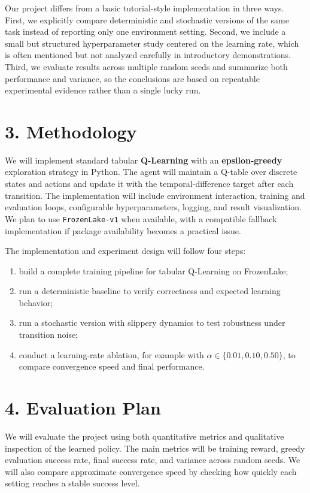 \documentclass[11pt]{article}
\begin{document}
Our project differs from a basic tutorial-style implementation in three ways. First, we explicitly compare deterministic and stochastic versions of the same task instead of reporting only one environment setting. Second, we include a small but structured hyperparameter study centered on the learning rate, which is often mentioned but not analyzed carefully in introductory demonstrations. Third, we evaluate results across multiple random seeds and summarize both performance and variance, so the conclusions are based on repeatable experimental evidence rather than a single lucky run.

\section*{3. Methodology}
We will implement standard tabular \textbf{Q-Learning} with an \textbf{epsilon-greedy} exploration strategy in Python. The agent will maintain a Q-table over discrete states and actions and update it with the temporal-difference target after each transition. The implementation will include environment interaction, training and evaluation loops, configurable hyperparameters, logging, and result visualization. We plan to use \texttt{FrozenLake-v1} when available, with a compatible fallback implementation if package availability becomes a practical issue.

The implementation and experiment design will follow four steps:
\begin{enumerate}[leftmargin=1.5em]
\item build a complete training pipeline for tabular Q-Learning on FrozenLake;
\item run a deterministic baseline to verify correctness and expected learning behavior;
\item run a stochastic version with slippery dynamics to test robustness under transition noise;
\item conduct a learning-rate ablation, for example with $\alpha \in \{0.01, 0.10, 0.50\}$, to compare convergence speed and final performance.
\end{enumerate}

\section*{4. Evaluation Plan}
We will evaluate the project using both quantitative metrics and qualitative inspection of the learned policy. The main metrics will be training reward, greedy evaluation success rate, final success rate, and variance across random seeds. We will also compare approximate convergence speed by checking how quickly each setting reaches a stable success level.
\end{document}
